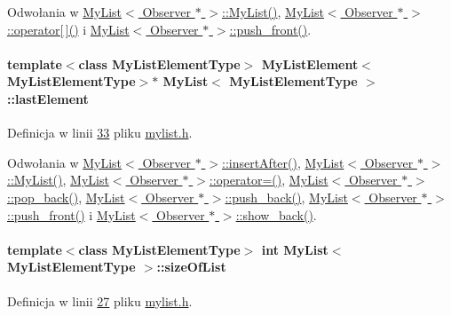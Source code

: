 Odwołania w \hyperlink{mylist_8h_source_l00039}{My\-List$<$ Observer $\ast$ $>$\-::\-My\-List()}, \hyperlink{mylist_8h_source_l00171}{My\-List$<$ Observer $\ast$ $>$\-::operator\mbox{[}$\,$\mbox{]}()} i \hyperlink{mylist_8h_source_l00125}{My\-List$<$ Observer $\ast$ $>$\-::push\-\_\-front()}.

\hypertarget{class_my_list_a70831dde3a7f24c7d3dd5b30980e8c27}{
\paragraph[{last\-Element}]{\setlength{\rightskip}{0pt plus 5cm}template$<$class My\-List\-Element\-Type$>$ {\bf My\-List\-Element}$<$My\-List\-Element\-Type$>$$\ast$ {\bf My\-List}$<$ My\-List\-Element\-Type $>$\-::last\-Element}}\label{class_my_list_a70831dde3a7f24c7d3dd5b30980e8c27}


Definicja w linii \hyperlink{mylist_8h_source_l00033}{33} pliku \hyperlink{mylist_8h_source}{mylist.\-h}.



Odwołania w \hyperlink{mylist_8h_source_l00212}{My\-List$<$ Observer $\ast$ $>$\-::insert\-After()}, \hyperlink{mylist_8h_source_l00039}{My\-List$<$ Observer $\ast$ $>$\-::\-My\-List()}, \hyperlink{mylist_8h_source_l00234}{My\-List$<$ Observer $\ast$ $>$\-::operator=()}, \hyperlink{mylist_8h_source_l00084}{My\-List$<$ Observer $\ast$ $>$\-::pop\-\_\-back()}, \hyperlink{mylist_8h_source_l00112}{My\-List$<$ Observer $\ast$ $>$\-::push\-\_\-back()}, \hyperlink{mylist_8h_source_l00125}{My\-List$<$ Observer $\ast$ $>$\-::push\-\_\-front()} i \hyperlink{mylist_8h_source_l00147}{My\-List$<$ Observer $\ast$ $>$\-::show\-\_\-back()}.

\hypertarget{class_my_list_a5a3a323664c97313be3a8d0b36866c3f}{
\paragraph[{size\-Of\-List}]{\setlength{\rightskip}{0pt plus 5cm}template$<$class My\-List\-Element\-Type$>$ int {\bf My\-List}$<$ My\-List\-Element\-Type $>$\-::size\-Of\-List}}\label{class_my_list_a5a3a323664c97313be3a8d0b36866c3f}


Definicja w linii \hyperlink{mylist_8h_source_l00027}{27} pliku \hyperlink{mylist_8h_source}{mylist.\-h}.




